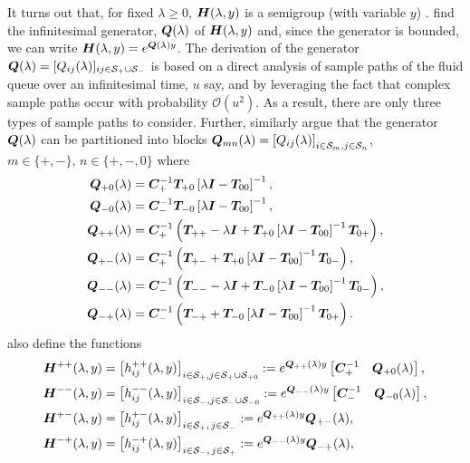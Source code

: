 It turns out that, for fixed \(\lambda \geq 0\), \(\boldsymbol H (\lambda,y)\) is a semigroup (with variable \(y\)) \citep{bean2005}. \cite{bean2005} find the infinitesimal generator, \(\boldsymbol Q(\lambda)\) of \(\boldsymbol H(\lambda,y)\) and, since the generator is bounded, we can write \(\boldsymbol H(\lambda,y)=e^{\boldsymbol Q(\lambda)y}\). The derivation of the generator \(\boldsymbol Q(\lambda)=[Q_{ij}(\lambda)]_{ij\in\mathcal{S}_+\cup\mathcal{S}_-}\) is based on a direct analysis of sample paths of the fluid queue over an infinitesimal time, \(u\) say, and by leveraging the fact that complex sample paths occur with probability \(\mathcal O(u^2)\). As a result, there are only three types of sample paths to consider. Further, \cite{bean2005} similarly argue that the generator \(\boldsymbol Q(\lambda)\) can be partitioned into blocks \(\boldsymbol Q_{mn}(\lambda) = \left[Q_{ij}(\lambda)\right]_{i\in\mathcal{S}_m,j\in\mathcal{S}_n}\), \(m\in\{+,-\},\,n\in\{+,-,0\}\) where 
\begin{align*}
	\boldsymbol Q_{+0}(\lambda) &= \boldsymbol C_+^{-1}\boldsymbol T_{+0}\left[\lambda \boldsymbol I - \boldsymbol T_{00}\right]^{-1},
	\\\boldsymbol Q_{-0}(\lambda) &= \boldsymbol C_-^{-1}\boldsymbol T_{-0}\left[\lambda \boldsymbol I - \boldsymbol T_{00}\right]^{-1},
	\\\boldsymbol Q_{++}(\lambda) &= \boldsymbol C_+^{-1} \left(\boldsymbol T_{++} - \lambda \boldsymbol I + \boldsymbol T_{+0}\left[\lambda \boldsymbol I - \boldsymbol T_{00}\right]^{-1}\boldsymbol T_{0+}\right),
	\\\boldsymbol Q_{+-}(\lambda) &= \boldsymbol C_+^{-1} \left(\boldsymbol T_{+-} + \boldsymbol T_{+0}\left[\lambda \boldsymbol I - \boldsymbol T_{00}\right]^{-1}\boldsymbol T_{0-} \right) ,
	\\\boldsymbol Q_{--}(\lambda) &= \boldsymbol C_-^{-1} \left(\boldsymbol T_{--}  - \lambda \boldsymbol I + \boldsymbol T_{-0}\left[\lambda \boldsymbol I - \boldsymbol T_{00}\right]^{-1}\boldsymbol T_{0-}\right),
	\\\boldsymbol Q_{-+}(\lambda) &=\boldsymbol C_-^{-1} \left(\boldsymbol T_{-+}+ \boldsymbol T_{-0}\left[\lambda \boldsymbol I - \boldsymbol T_{00}\right]^{-1}\boldsymbol T_{0+}\right).
\end{align*}
\cite{bean2005} also define the functions 
\begin{align}
	\boldsymbol H^{++}(\lambda,y)&= \left[h_{ij}^{++}(\lambda,y)\right]_{i\in \mathcal S_+,j\in\mathcal S_{+}\cup\mathcal{S}_{+0}} := e^{\boldsymbol{Q}_{++}(\lambda)y}\begin{bmatrix} \boldsymbol C_+^{-1} & \boldsymbol Q_{+0}(\lambda) \end{bmatrix},  \label{eqn: lst 1a}
	\\\boldsymbol H^{--}(\lambda,y) &= \left[h_{ij}^{--}(\lambda,y)\right]_{i\in\mathcal S_-,j\in\mathcal S_{-}\cup\mathcal{S}_{-0}}:= e^{\boldsymbol{Q}_{--}(\lambda)y}\begin{bmatrix} \boldsymbol C_-^{-1} & \boldsymbol Q_{-0}(\lambda) \end{bmatrix},
	\\\boldsymbol H^{+-}(\lambda,y)  &= \left[h_{ij}^{+-}(\lambda,y)\right]_{i\in\mathcal S_+,\,j\in\mathcal S_-}:= e^{\boldsymbol{Q}_{++}(\lambda)y}\boldsymbol{Q}_{+-}(\lambda), 
	\\\boldsymbol H^{-+}(\lambda,y)&= \left[h_{ij}^{-+}(\lambda,y)\right]_{i\in\mathcal S_-,\, j\in\mathcal S_+} := e^{\boldsymbol{Q}_{--}(\lambda)y}\boldsymbol{Q}_{-+}(\lambda), \label{eqn: lst 4a}
\end{align}
